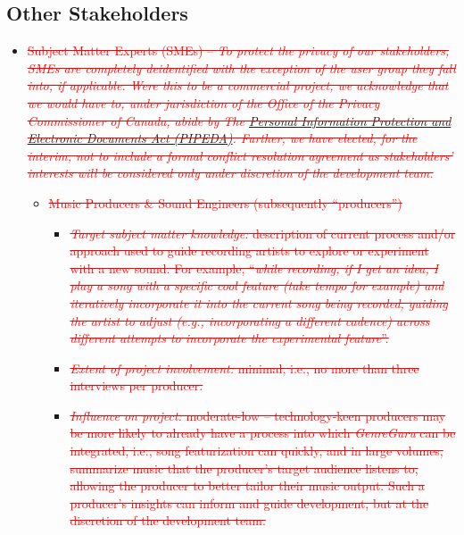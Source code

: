 \documentclass[12pt]{article}
\begin{document}
\subsection{Other Stakeholders} \label{2.3-other-stakeholders}
\begin{itemize}
  \item \textcolor{red}{\sout{Subject Matter Experts (SMEs) -- \emph{To protect the privacy of our stakeholders, SMEs are completely deidentified with the exception of the user group they fall into, if applicable. Were this to be a commercial project, we acknowledge that we would have to, under jurisdiction of the Office of the Privacy Commissioner of Canada, abide by The \href{https://www.priv.gc.ca/en/privacy-topics/privacy-laws-in-canada/the-personal-information-protection-and-electronic-documents-act-pipeda/}{Personal Information Protection and Electronic Documents Act (PIPEDA)}. Further, we have elected, for the interim, not to include a formal conflict resolution agreement as stakeholders' interests will be considered only under discretion of the development team.}}}
  
  \begin{itemize}
    \item \textcolor{red}{\sout{Music Producers \& Sound Engineers (subsequently ``producers'')}}
    \begin{itemize}
      \item \textcolor{red}{\sout{\emph{Target subject matter knowledge:} description of current process and/or approach used to guide recording artists to explore or experiment with a new \textcolor{red}{sound}. For example, ``\emph{while recording, if I get an idea, I play a song with a specific cool feature (take tempo for example) and iteratively incorporate it into the current song being recorded, guiding the artist to adjust (e.g., incorporating a different cadence) across different attempts to incorporate the experimental feature}''.}} 
      \item \textcolor{red}{\sout{\emph{Extent of project involvement:} minimal, i.e., no more than three interviews per producer.}}
      \item \textcolor{red}{\sout{\emph{Influence on project:} moderate-low -- technology-keen producers may be more likely to already have a process into which \emph{GenreGuru} can be integrated, i.e., song featurization can quickly, and in large volumes, summarize music that the producer's target audience listens to, allowing the producer to better tailor their music output. Such a producer's insights can inform and guide development, but at the discretion of the development team.}}
    \end{itemize}
    

\end{itemize}
\end{itemize}
\end{document}
